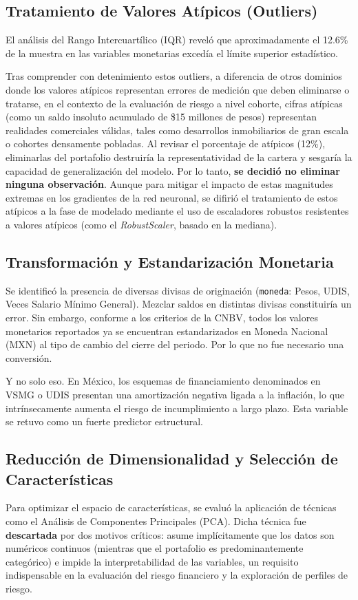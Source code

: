 \subsection{Tratamiento de Valores Atípicos (Outliers)}
El análisis del Rango Intercuartílico (IQR) reveló que aproximadamente el 12.6\% de la muestra en las variables monetarias excedía el límite superior estadístico. 

Tras comprender con detenimiento estos outliers, a diferencia de otros dominios donde los valores atípicos representan errores de medición que deben eliminarse o tratarse, en el contexto de la evaluación de riesgo a nivel cohorte, cifras atípicas (como un saldo insoluto acumulado de \$15 millones de pesos) representan realidades comerciales válidas, tales como desarrollos inmobiliarios de gran escala o cohortes densamente pobladas. Al revisar el porcentaje de atípicos (12\%), eliminarlas del portafolio destruiría la representatividad de la cartera y sesgaría la capacidad de generalización del modelo. Por lo tanto, \textbf{se decidió no eliminar ninguna observación}. Aunque para mitigar el impacto de estas magnitudes extremas en los gradientes de la red neuronal, se difirió el tratamiento de estos atípicos a la fase de modelado mediante el uso de escaladores robustos resistentes a valores atípicos (como el \textit{RobustScaler}, basado en la mediana).

\subsection{Transformación y Estandarización Monetaria}
Se identificó la presencia de diversas divisas de originación (\texttt{moneda}: Pesos, UDIS, Veces Salario Mínimo General). Mezclar saldos en distintas divisas constituiría un error. Sin embargo, conforme a los criterios de la CNBV, todos los valores monetarios reportados ya se encuentran estandarizados en Moneda Nacional (MXN) al tipo de cambio del cierre del periodo. Por lo que no fue necesario una conversión.

Y no solo eso. En México, los esquemas de financiamiento denominados en VSMG o UDIS presentan una amortización negativa ligada a la inflación, lo que intrínsecamente aumenta el riesgo de incumplimiento a largo plazo. Esta variable se retuvo como un fuerte predictor estructural.

\subsection{Reducción de Dimensionalidad y Selección de Características}
Para optimizar el espacio de características, se evaluó la aplicación de técnicas como el Análisis de Componentes Principales (PCA). Dicha técnica fue \textbf{descartada} por dos motivos críticos: asume implícitamente que los datos son numéricos continuos (mientras que el portafolio es predominantemente categórico) e impide la interpretabilidad de las variables, un requisito indispensable en la evaluación del riesgo financiero y la exploración de perfiles de riesgo.


